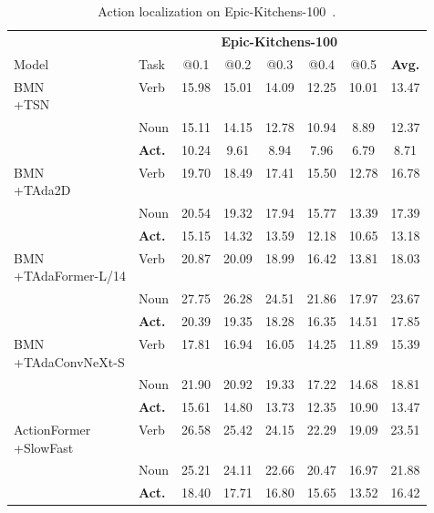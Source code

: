 \documentclass[10pt,journal,compsoc]{IEEEtran}
\newcommand{\tablestyle}[2]{\setlength{\tabcolsep}{#1}\renewcommand{\arraystretch}{#2}\centering\small}
\begin{document}
\begin{table}[t]
    \caption{Action localization on Epic-Kitchens-100~\cite{ek100}.}
    \tablestyle{2pt}{1.0}
    \begin{tabular}{llcccccc}
        \toprule
        ~ & \multicolumn{7}{c}{\bf Epic-Kitchens-100} \\
        \cmidrule(r){2-8}
        Model & Task & @0.1 & @0.2 & @0.3 & @0.4 & @0.5 & \bf Avg. \\
        \midrule
        \multirowcell{3}[0pt][l]{BMN~\cite{bmn}\\+TSN} & Verb & 15.98 & 15.01 & 14.09 & 12.25 & 10.01 & 13.47\\
        ~ & Noun &15.11 & 14.15 & 12.78 & 10.94 & 8.89 & 12.37\\
        ~ & \bf Act. & 10.24 & 9.61 & 8.94 & 7.96 & 6.79 & 8.71\\
        \midrule
        \multirowcell{3}[0pt][l]{BMN~\cite{bmn}\\+TAda2D~\cite{huangtada}} & Verb & 19.70 & 18.49 & 17.41 & 15.50 & 12.78 & 16.78 \\
        ~ & Noun & 20.54 & 19.32 & 17.94 & 15.77 & 13.39 & 17.39 \\
        ~ & \bf Act. & 15.15 & 14.32 & 13.59 & 12.18 & 10.65 & 13.18 \\
        \midrule
        \multirowcell{3}[0pt][l]{BMN~\cite{bmn}\\+TAdaFormer-L/14} & Verb & 20.87 & 20.09 & 18.99 & 16.42 & 13.81 & 18.03 \\
        ~ & Noun & 27.75 & 26.28 & 24.51 & 21.86 & 17.97 & 23.67 \\
        ~ & \bf Act. & 20.39 & 19.35 & 18.28 & 16.35 & 14.51 & 17.85 \\
        \midrule
        \multirowcell{3}[0pt][l]{BMN~\cite{bmn}\\+TAdaConvNeXt-S} & Verb &17.81 & 16.94 & 16.05 & 14.25 & 11.89 & 15.39 \\
        ~ & Noun &21.90 & 20.92 & 19.33 & 17.22 & 14.68 & 18.81 \\
        ~ & \bf Act. &15.61 & 14.80 & 13.73 & 12.35 & 10.90 & 13.47 \\
        \toprule
        \multirowcell{3}[0pt][l]{ActionFormer~\cite{zhang2022actionformer}\\+SlowFast} & Verb & 26.58 & 25.42 & 24.15 & 22.29 & 19.09 & 23.51\\
        ~ & Noun & 25.21 & 24.11 & 22.66 & 20.47 & 16.97 & 21.88\\
        ~ & \bf Act. & 18.40 & 17.71 & 16.80 & 15.65 & 13.52 & 16.42\\

\end{tabular}
\end{table}
\end{document}
